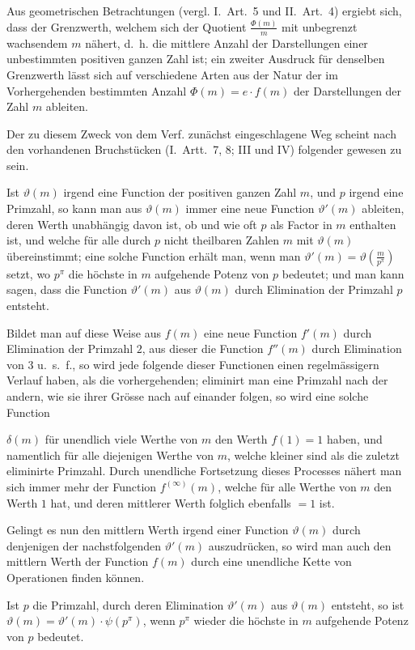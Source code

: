 \documentclass[12pt,a4paper]{article}
\begin{document}
Aus geometrischen Betrachtungen (vergl. I.~Art.~5 und II.~Art.~4) ergiebt sich, dass der Grenzwerth,
welchem sich der Quotient $\frac{\Phi(m)}{m}$ mit unbegrenzt wachsendem $m$ nähert, d.~h. die mittlere Anzahl
der Darstellungen einer unbestimmten positiven ganzen Zahl ist; ein zweiter Ausdruck für denselben
Grenzwerth lässt sich auf verschiedene Arten aus der Natur der im Vorhergehenden bestimmten
Anzahl $\Phi(m) = e \cdot f(m)$ der Darstellungen der Zahl $m$ ableiten.

Der zu diesem Zweck von dem Verf. zunächst eingeschlagene Weg scheint nach den vorhandenen
Bruchstücken (I.~Artt.~7, 8; III und IV) folgender gewesen zu sein.

Ist $\vartheta(m)$ irgend eine Function der positiven ganzen Zahl $m$, und $p$ irgend eine Primzahl,
so kann man aus $\vartheta(m)$ immer eine neue Function $\vartheta'(m)$ ableiten, deren Werth unabhängig davon
ist, ob und wie oft $p$ als Factor in $m$ enthalten ist, und welche für alle durch $p$ nicht theilbaren
Zahlen $m$ mit $\vartheta(m)$ übereinstimmt; eine solche Function erhält man, wenn man
$\vartheta'(m) = \vartheta\left(\frac{m}{p^{\pi}}\right)$ setzt, wo $p^{\pi}$ die höchste in $m$ aufgehende Potenz von $p$ bedeutet;
und man kann sagen, dass die Function $\vartheta'(m)$ aus $\vartheta(m)$ durch Elimination der Primzahl $p$ entsteht.

Bildet man auf diese Weise aus $f(m)$ eine neue Function $f'(m)$ durch Elimination der Primzahl $2$,
aus dieser die Function $f''(m)$ durch Elimination von $3$ u.~s.~f., so wird jede folgende dieser Functionen
einen regelmässigern Verlauf haben, als die vorhergehenden; eliminirt man eine Primzahl nach der andern,
wie sie ihrer Grösse nach auf einander folgen, so wird eine solche Function


$\delta(m)$ für unendlich viele Werthe von $m$ den Werth $f(1) = 1$ haben, und namentlich für alle
diejenigen Werthe von $m$, welche kleiner sind als die zuletzt eliminirte Primzahl.
Durch unendliche Fortsetzung dieses Processes nähert man sich immer mehr der Function $f^{(\infty)}(m)$,
welche für alle Werthe von $m$ den Werth $1$ hat, und deren mittlerer Werth folglich ebenfalls $= 1$ ist.

Gelingt es nun den mittlern Werth irgend einer Function $\vartheta(m)$ durch denjenigen der nachstfolgenden
$\vartheta'(m)$ auszudrücken, so wird man auch den mittlern Werth der Function $f(m)$ durch eine unendliche
Kette von Operationen finden können.

Ist $p$ die Primzahl, durch deren Elimination $\vartheta'(m)$ aus $\vartheta(m)$ entsteht, so ist $\vartheta(m) = \vartheta'(m) \cdot \psi(p^{\pi})$,
wenn $p^{\pi}$ wieder die höchste in $m$ aufgehende Potenz von $p$ bedeutet.
\end{document}
